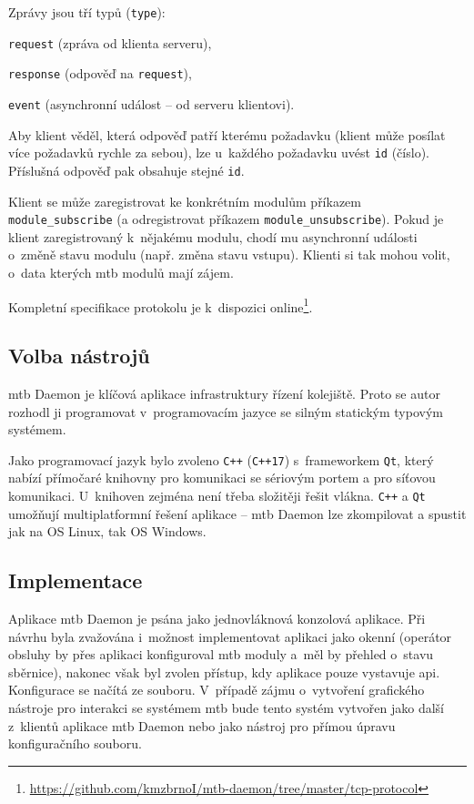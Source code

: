 Zprávy jsou tří typů (\texttt{type}):

\begin{compactenum}
\item \texttt{request} (zpráva od klienta serveru),
\item \texttt{response} (odpověď na \texttt{request}),
\item \texttt{event} (asynchronní událost – od serveru klientovi).
\end{compactenum}

Aby klient věděl, která odpověď patří kterému požadavku (klient může posílat
více požadavků rychle za sebou), lze u~každého požadavku uvést \texttt{id}
(číslo). Příslušná odpověď pak obsahuje stejné \texttt{id}.

Klient se může zaregistrovat ke konkrétním modulům příkazem \\
\texttt{module\_subscribe} (a odregistrovat příkazem
\texttt{module\_unsubscribe}). Pokud je klient zaregistrovaný k~nějakému modulu,
chodí mu asynchronní události o~změně stavu modulu (např. změna stavu vstupu).
Klienti si tak mohou volit, o~data kterých \gls{mtb} modulů mají zájem.

Kompletní specifikace protokolu je k~dispozici
online\footnote{\url{https://github.com/kmzbrnoI/mtb-daemon/tree/master/tcp-protocol}}.

\subsection{Volba nástrojů} \label{sec:daemon:tools}

\gls{mtb} Daemon je klíčová aplikace infrastruktury řízení kolejiště. Proto se
autor rozhodl ji programovat v~programovacím jazyce se silným statickým typovým
systémem.

Jako programovací jazyk bylo zvoleno \texttt{C++} (\texttt{C++17})
s~frameworkem \texttt{Qt}, který nabízí přímočaré knihovny pro komunikaci se
sériovým portem a pro síťovou komunikaci. U~knihoven zejména není třeba
složitěji řešit vlákna. \texttt{C++} a \texttt{Qt} umožňují multiplatformní
řešení aplikace – \gls{mtb} Daemon lze zkompilovat a spustit jak na
OS Linux, tak OS Windows.

\subsection{Implementace} \label{sec:daemon:impl}

Aplikace \gls{mtb} Daemon je psána jako jednovláknová konzolová aplikace.
Při návrhu byla zvažována i~možnost implementovat aplikaci jako okenní
(operátor obsluhy by přes aplikaci konfiguroval \gls{mtb} moduly a~měl by
přehled o~stavu sběrnice), nakonec však byl zvolen přístup, kdy aplikace pouze
vystavuje \gls{api}. Konfigurace se načítá ze souboru. V~případě zájmu o~vytvoření
grafického nástroje pro interakci se systémem \gls{mtb} bude tento systém
vytvořen jako další z~klientů aplikace \gls{mtb} Daemon nebo jako
nástroj pro přímou úpravu konfiguračního souboru.

